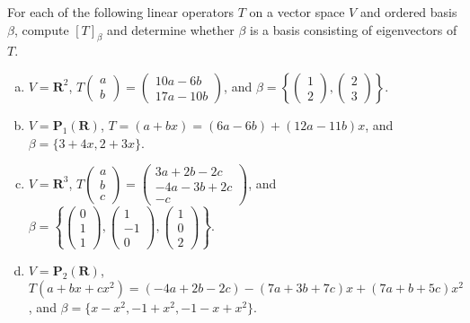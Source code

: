 \documentclass[a4paper,11pt]{article}
\newcommand{\R}{\mathbf{R}}
\newcommand{\PP}{\mathbf{P}}
\begin{document}
 For each of the following linear operators $T$ on
a vector space $V$ and ordered basis $\beta$, compute $[T]_\beta$ and determine
whether $\beta$ is a basis consisting of eigenvectors of $T$.
\begin{enumerate}[(a)]
\item $V=\R^2$,
  $T\left( \begin{smallmatrix}a\\b\end{smallmatrix} \right)=
  \left( \begin{smallmatrix}10a-6b\\17a-10b\end{smallmatrix} \right)$,
  and
  $\beta=\left\{ \left( \begin{smallmatrix}1\\2\end{smallmatrix} \right),
  \left( \begin{smallmatrix}2\\3\end{smallmatrix} \right)\right\}$.

\item $V=\PP_1(\R)$, $T=(a+bx)=(6a-6b)+(12a-11b)x$, and $\beta=\{3+4x, 2+3x\}$.
  
\item $V=\R^3$,
  $T\left( \begin{smallmatrix}a\\b\\c\end{smallmatrix} \right)=
  \left( \begin{smallmatrix}3a+2b-2c\\-4a-3b+2c\\-c\end{smallmatrix} \right)$,
  and
  $\beta=\left\{ \left( \begin{smallmatrix}0\\1\\1\end{smallmatrix} \right),
    \left( \begin{smallmatrix}1\\-1\\0\end{smallmatrix} \right),
  \left( \begin{smallmatrix}1\\0\\2\end{smallmatrix} \right)\right\}$.

\item $V=\PP_2(\R)$, $T(a+bx+cx^2)=(-4a+2b-2c)-(7a+3b+7c)x+(7a+b+5c)x^2$, and
  $\beta=\{x-x^2,-1+x^2,-1-x+x^2\}$.


\end{enumerate}
\end{document}

